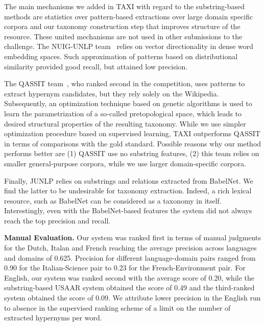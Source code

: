 \documentclass[11pt,letterpaper]{article}
\begin{document}
The main mechanisms we added in TAXI with regard to the substring-based methods are statistics over pattern-based extractions over large domain specific corpora and our taxonomy construction step that improves structure of the resource. These united mechanisms are not used in other submissions to the challenge. The NUIG-UNLP team~\cite{nuigsemeval2016} relies on vector directionality in dense word embedding spaces. Such approximation of patterns based on distributional similarity provided good recall, but  attained low precision. 

The QASSIT team~\cite{qassitsemeval2016}, who ranked second in the competition, uses patterns to extract hypernym candidates, but they rely solely on the Wikipedia. Subsequently, an optimization technique based on genetic algorithms is used to learn the parametrization of a so-called pretopological space, which leads to desired structural properties of the resulting taxonomy.  While we use simpler optimization procedure based on supervised learning, TAXI  outperforms QASSIT in terms of comparisons with the gold standard. Possible reasons why our method performs better are (1) QASSIT use no substring features, (2) this team relies on smaller general-purpose corpora, while we use larger domain-specific corpora. 

Finally, JUNLP relies on substrings and relations extracted from BabelNet. We find the latter to be undesirable for taxonomy extraction. Indeed, a rich lexical resource, such as BabelNet can be considered as a taxonomy in itself.  Interestingly, even with the BabelNet-based features the system did not always reach the top precision and recall. 

\textbf{Manual Evaluation. } Our system was ranked first in terms of manual judgments for the Dutch, Italan and French reaching the average precision across languages and domains of 0.625. Precision for different language-domain pairs ranged from 0.90 for the Italian-Science pair to 0.23 for the French-Environment pair. For English, our system was ranked second with the average score of 0.20, while the substring-based USAAR system obtained the score of 0.49 and the third-ranked system obtained the score of 0.09. We attribute lower precision in the English run to absence  in the supervised ranking scheme of a limit on the number of extracted hypernyms per word. 
\end{document}

